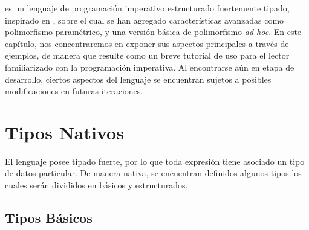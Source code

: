 \Lenguaje{} es un lenguaje de programación imperativo estructurado fuertemente tipado, inspirado en \Pascal{}, sobre el cual se han agregado características avanzadas como polimorfismo paramétrico, y una versión básica de polimorfismo \textit{ad hoc}.
En este capítulo, nos concentraremos en exponer sus aspectos principales a través de ejemplos, de manera que resulte como un breve tutorial de uso para el lector familiarizado con la programación imperativa.
Al encontrarse aún en etapa de desarrollo, ciertos aspectos del lenguaje se encuentran sujetos a posibles modificaciones en futuras iteraciones.

\section{Tipos Nativos}

El lenguaje posee tipado fuerte, por lo que toda expresión tiene asociado un tipo de datos particular.
De manera nativa, se encuentran definidos algunos tipos los cuales serán divididos en básicos y estructurados.

\subsection{Tipos Básicos}

